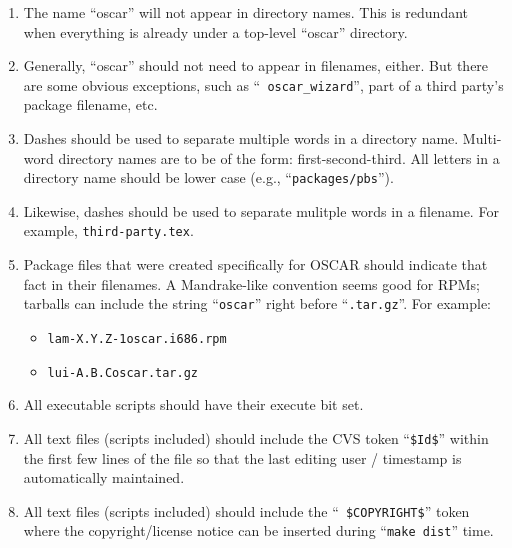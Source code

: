 \begin{enumerate}
\item The name ``oscar'' will not appear in directory names.  This is
  redundant when everything is already under a top-level ``oscar''
  directory.
  
\item Generally, ``oscar'' should not need to appear in filenames,
  either.  But there are some obvious exceptions, such as ``{\tt
    oscar\_wizard}'', part of a third party's package filename, etc.
  
\item Dashes should be used to separate multiple words in a directory
  name.  Multi-word directory names are to be of the form:
  first-second-third.  All letters in a directory name should be lower
  case (e.g., ``{\tt packages/pbs}'').

\item Likewise, dashes should be used to separate mulitple words in a
  filename.  For example, {\tt third-party.tex}.
  
\item Package files that were created specifically for OSCAR should
  indicate that fact in their filenames.  A Mandrake-like convention
  seems good for RPMs; tarballs can include the string ``{\tt oscar}''
  right before ``{\tt .tar.gz}''.  For example:

  \begin{itemize}
  \item {\tt lam-{\rm X}.{\rm Y}.{\rm Z}-1oscar.i686.rpm}
  \item {\tt lui-{\rm A}.{\rm B}.{\rm C}oscar.tar.gz}
  \end{itemize}

\item All executable scripts should have their execute bit set.
  
\item All text files (scripts included) should include the CVS token
  ``{\tt \$Id\$}'' within the first few lines of the file so that the
  last editing user / timestamp is automatically maintained.
  
\item All text files (scripts included) should include the ``{\tt
    \$COPYRIGHT\$}'' token where the copyright/license notice can be
  inserted during ``{\tt make dist}'' time.

\end{enumerate}

